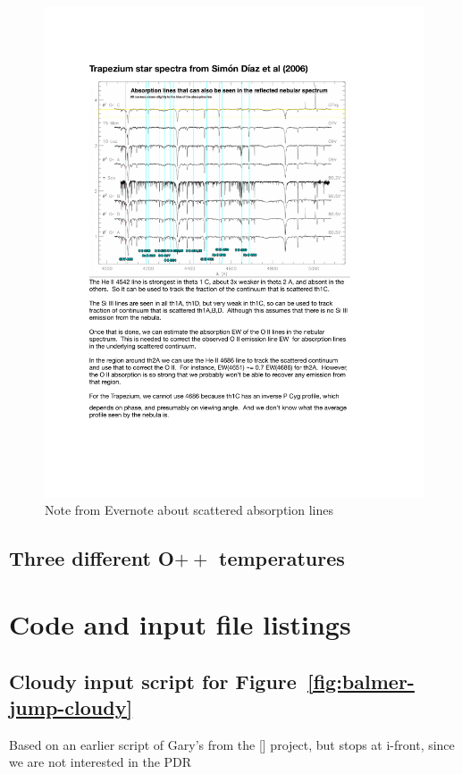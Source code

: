 \documentclass[preprint]{aastex}
\begin{document}
\begin{figure}
  \includegraphics[trim=50 50 50 50, width=\textwidth]{evernote-trap-spectrum}
  \caption{Note from Evernote about scattered absorption lines}
  \label{fig:abs-lines-evernote}
\end{figure}


\subsection{Three different O\(++\) temperatures}
\label{sec:three-different-o++}




\section{Code and input file listings}

\subsection{Cloudy input script for
  Figure~\ref{fig:balmer-jump-cloudy}}
\label{sec:cloudy-input-script}
Based on an earlier script of Gary's from the [] project,
but stops at i-front, since we are not interested in the PDR
\end{document}
